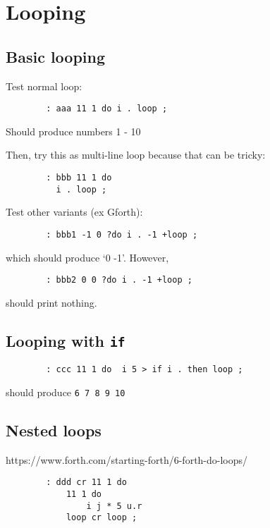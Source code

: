 \section{Looping}

\subsection{Basic looping}

Test normal loop:
\begin{lstlisting}
        : aaa 11 1 do i . loop ;        
\end{lstlisting}

\noindent Should produce numbers 1 - 10

Then, try this as multi-line loop because that can be tricky:
\begin{lstlisting}
        : bbb 11 1 do 
          i . loop ; 
\end{lstlisting}

\noindent Test other variants (ex Gforth):

\begin{lstlisting}
        : bbb1 -1 0 ?do i . -1 +loop ;
\end{lstlisting}

\noindent which should produce `0 -1'. However, 

\begin{lstlisting}
        : bbb2 0 0 ?do i . -1 +loop ;
\end{lstlisting}

\noindent should print nothing.


\subsection{Looping with \texttt{if}}

\begin{lstlisting}
        : ccc 11 1 do  i 5 > if i . then loop ; 
\end{lstlisting}

\noindent should produce \texttt{6 7 8 9 10}


\subsection{Nested loops}

\noindent https://www.forth.com/starting-forth/6-forth-do-loops/

\begin{lstlisting}
        : ddd cr 11 1 do
            11 1 do 
                i j * 5 u.r 
            loop cr loop ;
\end{lstlisting}


